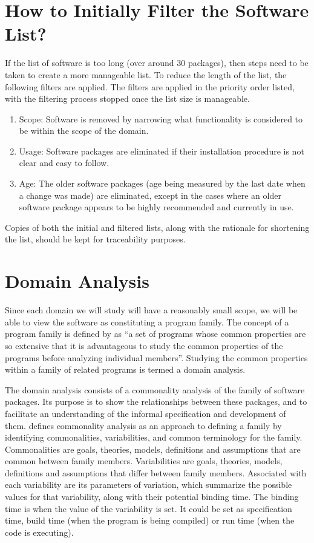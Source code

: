 \documentclass[letterpaper,cleveref]{lipics-v2019}
\begin{document}
\section{How to Initially Filter the Software List?} \label{SecInitialFilter}

If the list of software is too long (over around 30 packages), then steps need
to be taken to create a more manageable list. To reduce the length of the list,
the following filters are applied.  The filters are applied in the priority
order listed, with the filtering process stopped once the list size is
manageable.

\begin{enumerate}
\item Scope: Software is removed by narrowing what functionality is considered
  to be within the scope of the domain.
\item Usage: Software packages are eliminated if their installation procedure is
  not clear and easy to follow.
\item Age: The older software packages (age being measured by the last date when
  a change was made) are eliminated, except in the cases where an older software
  package appears to be highly recommended and currently in use.
\end{enumerate}

Copies of both the initial and filtered lists, along with the rationale for
shortening the list, should be kept for traceability purposes.

\section{Domain Analysis} \label{SecDomainAnalysis}

Since each domain we will study will have a reasonably small scope, we will be
able to view the software as constituting a program family.  The concept of a
program family is defined by \citet{parnas1976design} as ``a set of programs
whose common properties are so extensive that it is advantageous to study the
common properties of the programs before analyzing individual members''.
Studying the common properties within a family of related programs is termed a
domain analysis.

The domain analysis consists of a commonality analysis of the family of software
packages. Its purpose is to show the relationships between these packages, and
to facilitate an understanding of the informal specification and development of
them. \cite{weiss1997defining} defines commonality analysis as an approach to
defining a family by identifying commonalities, variabilities, and common
terminology for the family. Commonalities are goals, theories, models,
definitions and assumptions that are common between family members.
Variabilities are goals, theories, models, definitions and assumptions that
differ between family members. Associated with each variability are its
parameters of variation, which summarize the possible values for that
variability, along with their potential binding time.  The binding time is when
the value of the variability is set.  It could be set as specification time,
build time (when the program is being compiled) or run time (when the code is
executing).
\end{document}
